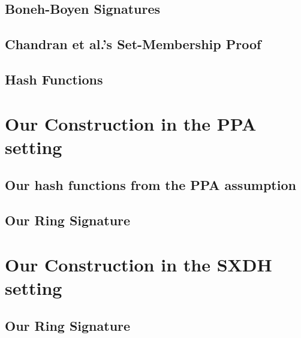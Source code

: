 \documentclass{llncs}
\begin{document}
		

	\subsection{Boneh-Boyen Signatures} \label{sec:bbs}
    
            

      	\subsection{Chandran et al.'s Set-Membership Proof} \label{sec:chan-rs}
	
       		

	\subsection{Hash Functions} \label{sec:hash}

		

    \section{Our Construction in the PPA setting} \label{sec:hf}
    
    	
    	
    	\subsection{Our hash functions from the PPA assumption} \label{sec:hf-ppa}
    	
    		
    		
    	\subsection{Our Ring Signature}\label{sec:our-construction-ppa}
        			 


	
	
	\section{Our Construction in the SXDH setting} \label{sec:high-level}
        
        		
    	
		\subsection{Our Ring Signature}\label{sec:our-construction}
        		 
		
\end{document}
